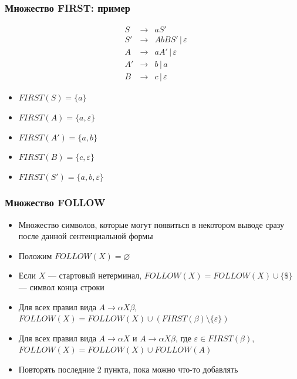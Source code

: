 \documentclass{beamer}
\begin{document}
\begin{frame}[fragile]
  \transwipe[direction=90]
  \frametitle{Множество FIRST: пример}
  $$
  \begin{array}{crcl}
  &S  & \rightarrow & a S' \\
  
  &S' & \rightarrow & A b B S' \, | \, \varepsilon \\
  
  &A  & \rightarrow & a A' \, | \, \varepsilon \\
  &A' & \rightarrow & b \, | \, a \\
  &B  & \rightarrow & c \, | \, \varepsilon  
  \end{array}
  $$ \pause
  
  \begin{itemize}
    \item $FIRST(S) = \{ a \}$ \pause
    \item $FIRST(A) = \{ a, \varepsilon \}$ \pause
    \item $FIRST(A') = \{ a, b \}$ \pause
    \item $FIRST(B) = \{ c, \varepsilon \}$ \pause
    \item $FIRST(S') = \{ a, b, \varepsilon \}$ 
  \end{itemize}
\end{frame}

\begin{frame}[fragile]
  \transwipe[direction=90]
  \frametitle{Множество FOLLOW}
  \begin{itemize}
   \item Множество символов, которые могут появиться в некотором выводе сразу после данной сентенциальной формы
   \item Положим $FOLLOW(X) = \varnothing $
   \item Если $X$ --- стартовый нетерминал, $FOLLOW(X) = FOLLOW(X) \cup \{ \$ \}$ --- символ конца строки
   \item Для всех правил вида $A \rightarrow \alpha X \beta$, $FOLLOW(X) = FOLLOW(X) \cup (FIRST(\beta) \setminus \{ \varepsilon\})$
   \item Для всех правил вида $A \rightarrow \alpha X$ и $A \rightarrow \alpha X \beta$, где $\varepsilon \in FIRST(\beta)$, $FOLLOW(X) = FOLLOW(X) \cup FOLLOW(A)$
   \item Повторять последние 2 пункта, пока можно что-то добавлять
  \end{itemize}
\end{frame}
\end{document}

